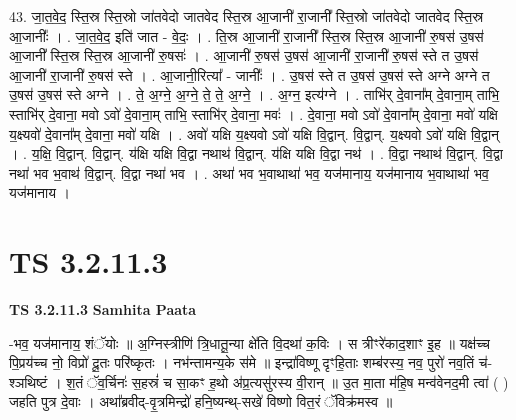 \documentclass[17pt]{extarticle}
\begin{document}
43. जा॒त॒वे॒द॒ स्ति॒स्र स्ति॒स्रो जा॑तवेदो जातवेद स्ति॒स्र आ॒जानी॑ रा॒जानी᳚ स्ति॒स्रो जा॑तवेदो जातवेद स्ति॒स्र आ॒जानीः᳚ । . जा॒त॒वे॒द॒ इति॑ जात - वे॒दः॒ । . ति॒स्र आ॒जानी॑ रा॒जानी᳚ स्ति॒स्र स्ति॒स्र आ॒जानी॑ रु॒षस॑ उ॒षस॑ आ॒जानी᳚ स्ति॒स्र स्ति॒स्र आ॒जानी॑ रु॒षसः॑ । . आ॒जानी॑ रु॒षस॑ उ॒षस॑ आ॒जानी॑ रा॒जानी॑ रु॒षस॑ स्ते त उ॒षस॑ आ॒जानी॑ रा॒जानी॑ रु॒षस॑ स्ते । . आ॒जानी॒रित्या᳚ - जानीः᳚ । . उ॒षस॑ स्ते त उ॒षस॑ उ॒षस॑ स्ते अग्ने अग्ने त उ॒षस॑ उ॒षस॑ स्ते अग्ने । . ते॒ अ॒ग्ने॒ अ॒ग्ने॒ ते॒ ते॒ अ॒ग्ने॒ । . अ॒ग्न॒ इत्य॑ग्ने । . ताभि॑र् दे॒वाना᳚म् दे॒वाना॒म् ताभि॒ स्ताभि॑र् दे॒वाना॒ मवो ऽवो॑ दे॒वाना॒म् ताभि॒ स्ताभि॑र् दे॒वाना॒ मवः॑ । . दे॒वाना॒ मवो ऽवो॑ दे॒वाना᳚म् दे॒वाना॒ मवो॑ यक्षि य॒क्ष्यवो॑ दे॒वाना᳚म् दे॒वाना॒ मवो॑ यक्षि । . अवो॑ यक्षि य॒क्ष्यवो ऽवो॑ यक्षि वि॒द्वान्. वि॒द्वान्. य॒क्ष्यवो ऽवो॑ यक्षि वि॒द्वान् । . य॒क्षि॒ वि॒द्वान्. वि॒द्वान्. य॑क्षि यक्षि वि॒द्वा नथाथ॑ वि॒द्वान्. य॑क्षि यक्षि वि॒द्वा नथ॑ । . वि॒द्वा नथाथ॑ वि॒द्वान्. वि॒द्वा नथा॑ भव भ॒वाथ॑ वि॒द्वान्. वि॒द्वा नथा॑ भव । . अथा॑ भव भ॒वाथाथा॑ भव॒ यज॑मानाय॒ यज॑मानाय भ॒वाथाथा॑ भव॒ यज॑मानाय । \newline
\pagebreak
{}

\section{ TS 3.2.11.3 }

\textbf{TS 3.2.11.3 } \newline
\textbf{Samhita Paata} \newline

-भव॒ यज॑मानाय॒ शंॅयोः ॥ अ॒ग्निस्त्रीणि॑ त्रि॒धातू॒न्या क्षे॑ति वि॒दथा॑ क॒विः । स त्रीꣳरे॑काद॒शाꣳ इ॒ह ॥ यक्ष॑च्च पि॒प्रय॑च्च नो॒ विप्रो॑ दू॒तः परि॑ष्कृतः । नभ॑न्तामन्य॒के स॑मे ॥ इन्द्रा॑विष्णू दृꣳहि॒ताः शम्ब॑रस्य॒ नव॒ पुरो॑ नव॒तिं च॑- श्ञथिष्टं । श॒तं ॅव॒र्चिनः॑ स॒हस्रं॑ च सा॒कꣳ ह॒थो अ॑प्र॒त्यसु॑रस्य वी॒रान् ॥ उ॒त मा॒ता म॑हि॒ष मन्व॑वेनद॒मी त्वा॑ ( ) जहति पुत्र दे॒वाः । अथा᳚ब्रवीद्-वृ॒त्रमिन्द्रो॑ हनि॒ष्यन्थ्-सखे॑ विष्णो वित॒रं ॅविक्र॑मस्व ॥ \newline
\end{document}
